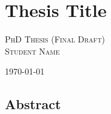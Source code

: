 \chapter*{Thesis Title}

\begin{center}
\Large{
\textsc{PhD Thesis (Final Draft) \\ Student Name \\ }
}

\today\ 
\end{center}

\clearpage

\section*{Abstract}


%

\listoftodos
\clearpage